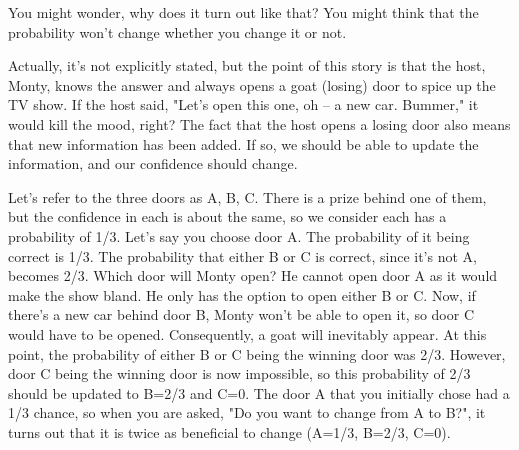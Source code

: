 \documentclass{ltjsbook}
\begin{document}
You might wonder, why does it turn out like that? You might think that the probability won't change whether you change it or not.

Actually, it's not explicitly stated, but the point of this story is that the host, Monty, knows the answer and always opens a goat (losing) door to spice up the TV show. If the host said, "Let's open this one, oh – a new car. Bummer," it would kill the mood, right? The fact that the host opens a losing door also means that new information has been added. If so, we should be able to update the information, and our confidence should change.

Let's refer to the three doors as A, B, C. There is a prize behind one of them, but the confidence in each is about the same, so we consider each has a probability of 1/3.
Let's say you choose door A. The probability of it being correct is 1/3. The probability that either B or C is correct, since it's not A, becomes 2/3.
Which door will Monty open? He cannot open door A as it would make the show bland. He only has the option to open either B or C. Now, if there's a new car behind door B, Monty won't be able to open it, so door C would have to be opened. Consequently, a goat will inevitably appear. At this point, the probability of either B or C being the winning door was 2/3. However, door C being the winning door is now impossible, so this probability of 2/3 should be updated to B=2/3 and C=0.
The door A that you initially chose had a 1/3 chance, so when you are asked, "Do you want to change from A to B?", it turns out that it is twice as beneficial to change (A=1/3, B=2/3, C=0).
\end{document}
